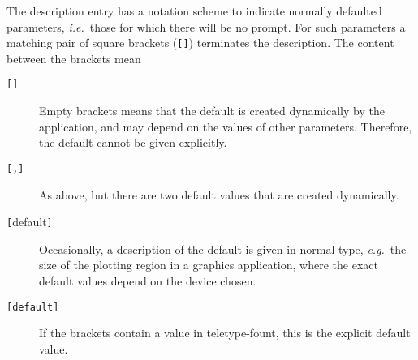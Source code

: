 \documentclass[twoside,11pt]{article}
\begin{document}
The description entry has a notation scheme to indicate
normally defaulted parameters, {\it{i.e.}}\ those for which there will
be no prompt.
For such parameters a matching pair of square brackets ({\tt{[]}})
terminates the description.  The content between the brackets mean
\begin{description}
\item[{\tt{[]}}]
Empty brackets means that the default is created dynamically
by the application, and may depend on the values of other parameters.
Therefore, the default cannot be given explicitly.
\item[{\tt [,]}]
As above, but there are two default values that are created dynamically.
\item[{\tt [}{\rm default}{\tt{]}}]
Occasionally, a description of the default is given in normal type,
{\it{e.g.}}\ the size of the plotting region in a graphics application,
where the exact default values depend on the device chosen.
\item[{\tt [default]}]
If the brackets contain a value in teletype-fount, this is the explicit
default value.
\end{description}
\end{document}
